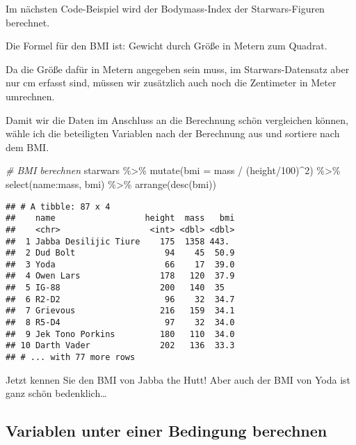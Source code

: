 \documentclass[
]{book}
\newenvironment{Shaded}{\begin{snugshade}}{\end{snugshade}}
\newcommand{\AttributeTok}[1]{\textcolor[rgb]{0.77,0.63,0.00}{#1}}
\newcommand{\CommentTok}[1]{\textcolor[rgb]{0.56,0.35,0.01}{\textit{#1}}}
\newcommand{\DecValTok}[1]{\textcolor[rgb]{0.00,0.00,0.81}{#1}}
\newcommand{\FunctionTok}[1]{\textcolor[rgb]{0.00,0.00,0.00}{#1}}
\newcommand{\NormalTok}[1]{#1}
\newcommand{\SpecialCharTok}[1]{\textcolor[rgb]{0.00,0.00,0.00}{#1}}
\begin{document}
Im nächsten Code-Beispiel wird der Bodymass-Index der Starwars-Figuren berechnet.

Die Formel für den BMI ist:
Gewicht durch Größe in Metern zum Quadrat.

Da die Größe dafür in Metern angegeben sein muss, im Starwars-Datensatz aber nur cm erfasst sind, müssen wir zusätzlich auch noch die Zentimeter in Meter umrechnen.

Damit wir die Daten im Anschluss an die Berechnung schön vergleichen können, wähle ich die beteiligten Variablen nach der Berechnung aus und sortiere nach dem BMI.

\begin{Shaded}
\begin{Highlighting}[]
\CommentTok{\# BMI berechnen}
\NormalTok{starwars }\SpecialCharTok{\%\textgreater{}\%} 
  \FunctionTok{mutate}\NormalTok{(}\AttributeTok{bmi =}\NormalTok{ mass }\SpecialCharTok{/}\NormalTok{ (height}\SpecialCharTok{/}\DecValTok{100}\NormalTok{)}\SpecialCharTok{\^{}}\DecValTok{2}\NormalTok{) }\SpecialCharTok{\%\textgreater{}\%} 
  \FunctionTok{select}\NormalTok{(name}\SpecialCharTok{:}\NormalTok{mass, bmi) }\SpecialCharTok{\%\textgreater{}\%} 
  \FunctionTok{arrange}\NormalTok{(}\FunctionTok{desc}\NormalTok{(bmi))}
\end{Highlighting}
\end{Shaded}

\begin{verbatim}
## # A tibble: 87 x 4
##    name                  height  mass   bmi
##    <chr>                  <int> <dbl> <dbl>
##  1 Jabba Desilijic Tiure    175  1358 443. 
##  2 Dud Bolt                  94    45  50.9
##  3 Yoda                      66    17  39.0
##  4 Owen Lars                178   120  37.9
##  5 IG-88                    200   140  35  
##  6 R2-D2                     96    32  34.7
##  7 Grievous                 216   159  34.1
##  8 R5-D4                     97    32  34.0
##  9 Jek Tono Porkins         180   110  34.0
## 10 Darth Vader              202   136  33.3
## # ... with 77 more rows
\end{verbatim}

Jetzt kennen Sie den BMI von Jabba the Hutt! Aber auch der BMI von Yoda ist ganz schön bedenklich\ldots{}

\hypertarget{variablen-unter-einer-bedingung-berechnen}{%
\subsection{Variablen unter einer Bedingung berechnen}\label{variablen-unter-einer-bedingung-berechnen}}
\end{document}

